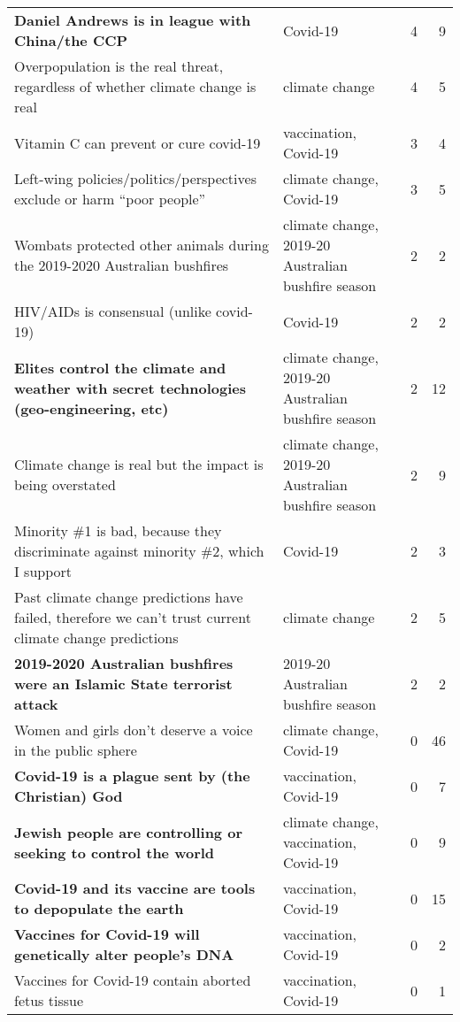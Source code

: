 \begin{table*}
\begin{tabular}{p{8cm}p{4cm}rr}
\textbf{Daniel Andrews is in league with China/the CCP} & Covid-19 & 4 & 9\\
Overpopulation is the real threat, regardless of whether climate change is real & climate change & 4 & 5\\
\addlinespace
Vitamin C can prevent or cure covid-19 & vaccination, Covid-19 & 3 & 4\\
Left-wing policies/politics/perspectives exclude or harm “poor people” & climate change, Covid-19 & 3 & 5\\
Wombats protected other animals during the 2019-2020 Australian bushfires & climate change, 2019-20 Australian bushfire season & 2 & 2\\
HIV/AIDs is consensual (unlike covid-19) & Covid-19 & 2 & 2\\
\textbf{Elites control the climate and weather with secret technologies (geo-engineering, etc)} & climate change, 2019-20 Australian bushfire season & 2 & 12\\
\addlinespace
Climate change is real but the impact is being overstated & climate change, 2019-20 Australian bushfire season & 2 & 9\\
Minority \#1 is bad, because they discriminate against minority \#2, which I support & Covid-19 & 2 & 3\\
Past climate change predictions have failed, therefore we can't trust current climate change predictions & climate change & 2 & 5\\
\textbf{2019-2020 Australian bushfires were an Islamic State terrorist attack} & 2019-20 Australian bushfire season & 2 & 2\\
Women and girls don't deserve a voice in the public sphere & climate change, Covid-19 & 0 & 46\\
\addlinespace
\textbf{Covid-19 is a plague sent by (the Christian) God} & vaccination, Covid-19 & 0 & 7\\
\textbf{Jewish people are controlling or seeking to control the world} & climate change, vaccination, Covid-19 & 0 & 9\\
\textbf{Covid-19 and its vaccine are tools to depopulate the earth} & vaccination, Covid-19 & 0 & 15\\
\textbf{Vaccines for Covid-19 will genetically alter people's DNA} & vaccination, Covid-19 & 0 & 2\\
Vaccines for Covid-19 contain aborted fetus tissue & vaccination, Covid-19 & 0 & 1\\
\bottomrule
\end{tabular}
\end{table*}